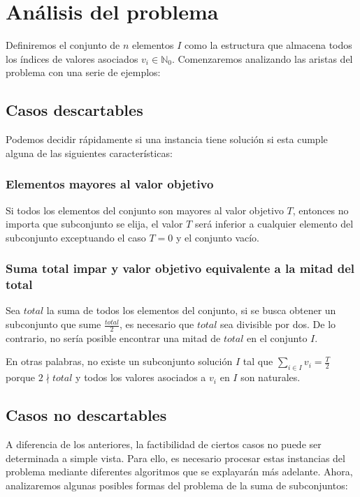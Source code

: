 \section{Análisis del problema}
Definiremos el conjunto de $n$ elementos $I$ como la estructura que almacena todos los índices de valores asociados $v_{i}\in \mathds{N}_{0}$.
Comenzaremos analizando las aristas del problema con una serie de ejemplos:

\vskip 8pt

\subsection{Casos descartables}
Podemos decidir rápidamente si una instancia tiene solución si esta cumple alguna de las siguientes características:

\subsubsection{Elementos mayores al valor objetivo}
Si todos los elementos del conjunto son mayores al valor objetivo $T$, entonces no importa que subconjunto se elija, el valor $T$ será inferior a cualquier elemento del subconjunto exceptuando el caso $T=0$ y el conjunto vacío.

\subsubsection{Suma total impar y valor objetivo equivalente a la mitad del total}
Sea $total$ la suma de todos los elementos del conjunto, si se busca obtener un subconjunto que sume $\frac{total}{2}$, es necesario que $total$ sea divisible por dos. De lo contrario, no sería posible encontrar una mitad de $total$ en el conjunto $I$.

\vskip 8pt

En otras palabras, no existe un subconjunto solución $I$ tal que $\sum_{i \in I}^{} v_{i} = \frac{T}{2}$ porque $2 \nmid total$ y todos los valores asociados a $v_{i}$ en $I$ son naturales.

\subsection{Casos no descartables}
A diferencia de los anteriores, la factibilidad de ciertos casos no puede ser determinada a simple vista. Para ello, es necesario procesar estas instancias del problema mediante diferentes algoritmos que se explayarán más adelante. Ahora, analizaremos algunas posibles formas del problema de la suma de subconjuntos:

